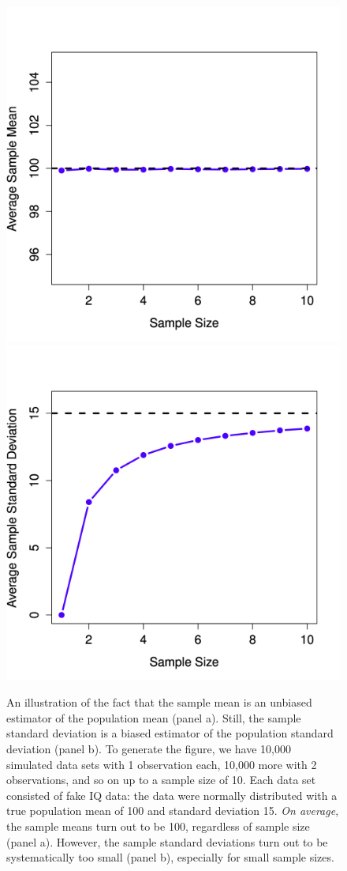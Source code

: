 \documentclass[
]{book}
\theoremstyle{definition}
\theoremstyle{definition}
\theoremstyle{definition}
\theoremstyle{definition}
\theoremstyle{remark}
\begin{document}
\begin{figure}

{\centering \includegraphics[width=0.45\linewidth]{resources/image/biasMean} \includegraphics[width=0.45\linewidth]{resources/image/biasSD} 

}

\caption{An illustration of the fact that the sample mean is an unbiased estimator of the population mean (panel a). Still, the sample standard deviation is a biased estimator of the population standard deviation (panel b). To generate the figure, we have 10,000 simulated data sets with 1 observation each, 10,000 more with 2 observations, and so on up to a sample size of 10. Each data set consisted of fake IQ data: the data were normally distributed with a true population mean of 100 and standard deviation 15. \emph{On average}, the sample means turn out to be 100, regardless of sample size (panel a). However, the sample standard deviations turn out to be systematically too small (panel b), especially for small sample sizes.}\label{fig:estimatorbias}
\end{figure}
\end{document}
